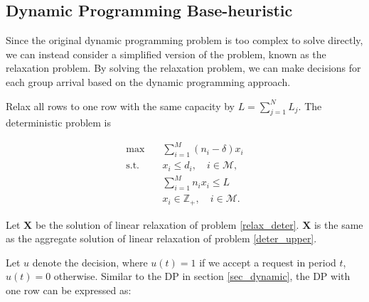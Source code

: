 \subsection{Dynamic Programming Base-heuristic}
Since the original dynamic programming problem is too complex to solve directly, we can instead consider a simplified version of the problem, known as the relaxation problem. By solving the relaxation problem, we can make decisions for each group arrival based on the dynamic programming approach.

Relax all rows to one row with the same capacity by $L = \sum_{j=1}^{N} L_j$. The deterministic problem is

\begin{equation}\label{relax_deter}
  \begin{aligned}
  \max \quad & \sum_{i=1}^{M} (n_i- \delta) x_{i} \\
  \text {s.t.} \quad & x_{i} \leq d_{i}, \quad i \in \mathcal{M}, \\
  & \sum_{i=1}^{M} n_{i} x_{i} \leq L \\
  & x_{i} \in \mathbb{Z}_{+}, \quad i \in \mathcal{M}.
  \end{aligned}
\end{equation}

\begin{lem}
 Let $\mathbf{X}$ be the solution of linear relaxation of problem \eqref{relax_deter}. $\mathbf{X}$ is the same as the aggregate
 solution of linear relaxation of problem \eqref{deter_upper}.
\end{lem}


Let $u$ denote the decision, where $u(t) = 1$ if we accept a request in period $t$, $u(t) =0$ otherwise. Similar to the DP in section \ref{sec_dynamic}, the DP with one row can be expressed as:

